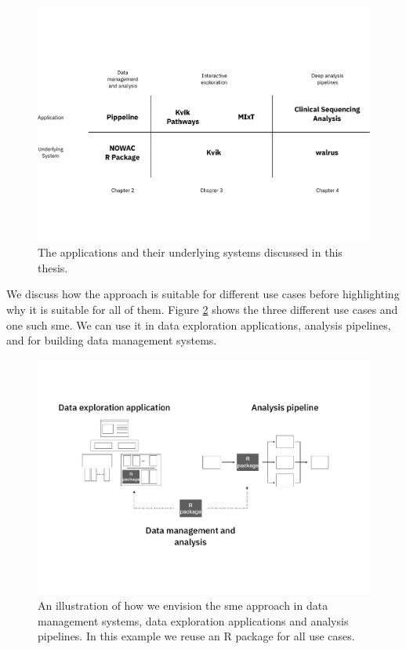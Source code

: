 \begin{figure}
\includegraphics[width=\textwidth]{figures/all-systems.pdf}
    \caption{The applications and their underlying systems discussed in this
    thesis.} 
    \label{overview-fig}
\end{figure} 


We discuss how the approach is suitable for different use cases before
highlighting why it is suitable for all of them. Figure \ref{overview-full}
shows the three different use cases and one such \gls{sme}. We can use it in
data exploration applications, analysis pipelines, and for building data
management systems.

\begin{figure}
\includegraphics[width=\textwidth]{figures/overview-full.pdf}
    \caption[The \gls{sme} approach in different systems.]{An illustration of
    how we envision the \gls{sme} approach in data management systems, data
    exploration applications and analysis pipelines. In this example we reuse an
    R package for all use cases.}
    \label{overview-full}
\end{figure} 

